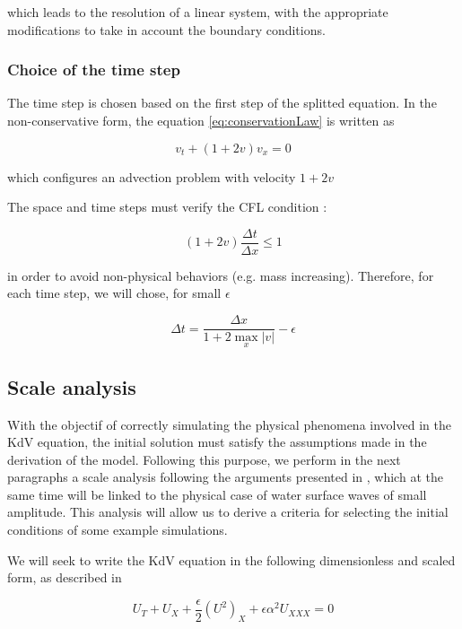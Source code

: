 \noindent which leads to the resolution of a linear system, with the appropriate modifications to take in account the boundary conditions.

\subsubsection{Choice of the time step}

\indent The time step is chosen based on the first step of the splitted equation. In the non-conservative form, the equation \eqref{eq:conservationLaw} is written as

\begin{equation}
v_t +  (1+2v)v_x = 0
\end{equation}

\noindent which configures an advection problem with velocity $1+2v$

\indent The space and time steps must verify the CFL condition : 

\begin{equation}
(1+2v)\frac{\Delta t}{\Delta x} \leq 1
\end{equation}

\noindent in order to avoid non-physical behaviors (e.g. mass increasing). Therefore, for each time step, we will chose, for small $\epsilon$

\begin{equation}
\Delta t = \frac{\Delta x}{1+2\max\limits_{x}|v|} - \epsilon
\end{equation}

\subsection{Scale analysis}

\indent With the objectif of correctly simulating the physical phenomena involved in the KdV equation, the initial solution must satisfy the assumptions made in the derivation of the model. Following this purpose, we perform in the next paragraphs a scale analysis following the arguments presented in \cite{BBM1971}, which at the same time will be linked to the physical case of water surface waves of small amplitude. This analysis will allow us to derive a criteria for selecting the initial conditions of some example simulations. 

\indent We will seek to write the KdV equation in the following dimensionless and scaled form, as described in \cite{BBM1971}

\begin{equation}
\label{eq:scaledKdV}
U_T + U_X + \frac{\epsilon}{2} (U^2)_X + \epsilon\alpha^2U_{XXX} = 0
\end{equation}

